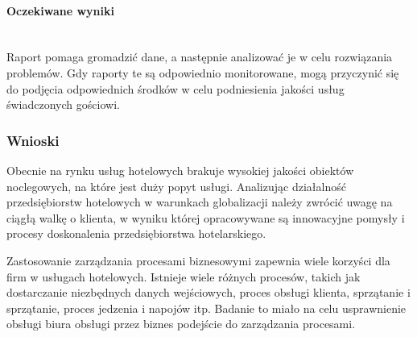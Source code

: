 \documentclass[a4paper, 12pt]{article}
\begin{document}
\paragraph{Oczekiwane wyniki}\mbox{}\\
\hspace*{1cm} Raport pomaga gromadzić dane, a następnie analizować je w celu rozwiązania problemów. Gdy raporty te są odpowiednio monitorowane, mogą przyczynić się do podjęcia odpowiednich środków w celu podniesienia jakości usług świadczonych gościowi.

\subsubsection{Wnioski}
\hspace*{1cm} Obecnie na rynku usług hotelowych brakuje wysokiej jakości obiektów noclegowych, na które jest duży popyt usługi.
Analizując działalność przedsiębiorstw hotelowych w warunkach globalizacji należy zwrócić uwagę na ciągłą walkę o klienta, w wyniku której opracowywane są innowacyjne pomysły i procesy doskonalenia przedsiębiorstwa hotelarskiego.

Zastosowanie zarządzania procesami biznesowymi zapewnia wiele korzyści dla firm w usługach hotelowych. Istnieje wiele różnych procesów, takich jak dostarczanie niezbędnych danych wejściowych, proces obsługi klienta, sprzątanie i sprzątanie, proces jedzenia i napojów itp. Badanie to miało na celu usprawnienie obsługi biura obsługi przez biznes podejście do zarządzania procesami.
\end{document}
